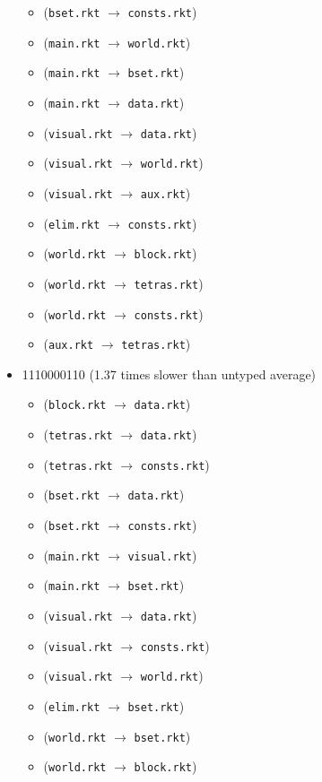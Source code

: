\documentclass{article}
\newcommand{\mono}[1]{\texttt{#1}}
\begin{document}
\begin{itemize}
\begin{itemize}
  \item (\mono{bset.rkt} $\rightarrow$ \mono{consts.rkt})
  \item (\mono{main.rkt} $\rightarrow$ \mono{world.rkt})
  \item (\mono{main.rkt} $\rightarrow$ \mono{bset.rkt})
  \item (\mono{main.rkt} $\rightarrow$ \mono{data.rkt})
  \item (\mono{visual.rkt} $\rightarrow$ \mono{data.rkt})
  \item (\mono{visual.rkt} $\rightarrow$ \mono{world.rkt})
  \item (\mono{visual.rkt} $\rightarrow$ \mono{aux.rkt})
  \item (\mono{elim.rkt} $\rightarrow$ \mono{consts.rkt})
  \item (\mono{world.rkt} $\rightarrow$ \mono{block.rkt})
  \item (\mono{world.rkt} $\rightarrow$ \mono{tetras.rkt})
  \item (\mono{world.rkt} $\rightarrow$ \mono{consts.rkt})
  \item (\mono{aux.rkt} $\rightarrow$ \mono{tetras.rkt})
  \end{itemize}
\item 1110000110 (1.37 times slower than untyped average)
  \begin{itemize}
  \item (\mono{block.rkt} $\rightarrow$ \mono{data.rkt})
  \item (\mono{tetras.rkt} $\rightarrow$ \mono{data.rkt})
  \item (\mono{tetras.rkt} $\rightarrow$ \mono{consts.rkt})
  \item (\mono{bset.rkt} $\rightarrow$ \mono{data.rkt})
  \item (\mono{bset.rkt} $\rightarrow$ \mono{consts.rkt})
  \item (\mono{main.rkt} $\rightarrow$ \mono{visual.rkt})
  \item (\mono{main.rkt} $\rightarrow$ \mono{bset.rkt})
  \item (\mono{visual.rkt} $\rightarrow$ \mono{data.rkt})
  \item (\mono{visual.rkt} $\rightarrow$ \mono{consts.rkt})
  \item (\mono{visual.rkt} $\rightarrow$ \mono{world.rkt})
  \item (\mono{elim.rkt} $\rightarrow$ \mono{bset.rkt})
  \item (\mono{world.rkt} $\rightarrow$ \mono{bset.rkt})
  \item (\mono{world.rkt} $\rightarrow$ \mono{block.rkt})

\end{itemize}
\end{itemize}
\end{document}
